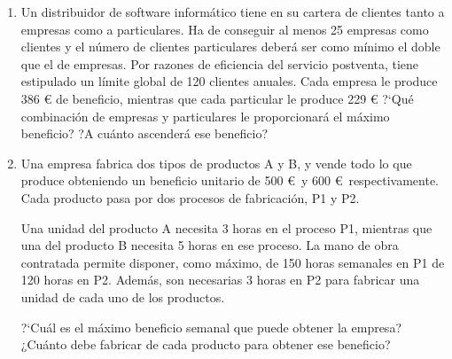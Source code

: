 \begin{adjustwidth}{20pt}{10pt}
\begin{enumerate}[PB. 1. ]
\hspace{-15mm}

\hspace{-15mm}\vspace{1cm}




\item Un distribuidor de software informático tiene en su cartera de clientes tanto a empresas como a particulares. Ha de conseguir al menos 25 empresas como clientes y el número de clientes particulares deberá ser como mínimo el doble que el de empresas. Por razones de eficiencia del servicio postventa, tiene estipulado un límite global de 120 clientes anuales. Cada empresa le produce 386 € de beneficio, mientras que cada particular le produce 229 € ?`Qué combinación de empresas y particulares le proporcionará el máximo beneficio? ?A cuánto ascenderá ese beneficio?

\hspace{-15mm}\vspace{1cm}



\item Una empresa fabrica dos tipos de productos A y B, y vende todo lo que
 produce obteniendo un beneficio unitario de 500 \euro $\,$ y 600 \euro $\,$ respectivamente. Cada producto pasa por dos procesos de fabricación, P1 y P2.

Una unidad del producto A necesita 3 horas en el proceso P1, mientras que una del producto B necesita 5 horas en ese proceso. La mano de obra contratada permite disponer, como máximo, de 150 horas semanales en P1 de 120 horas en P2. Además, son necesarias 3 horas en P2 para fabricar una unidad de cada uno de los productos.

?`Cuál es el máximo beneficio semanal que puede obtener la empresa? ¿Cuánto debe fabricar de cada producto para obtener ese beneficio?

\hspace{-15mm}\vspace{1cm}





\end{enumerate}
\end{adjustwidth}
